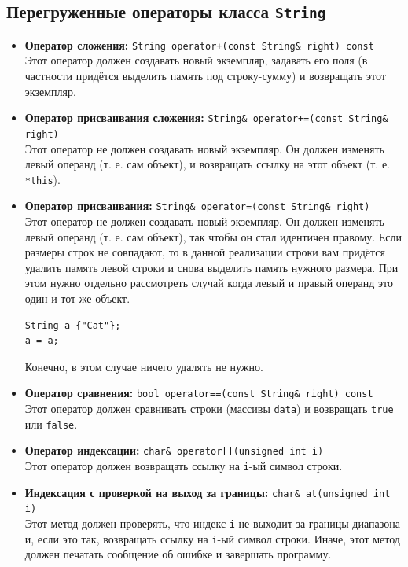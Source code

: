 \documentclass{article}
\begin{document}
\subsection*{Перегруженные операторы класса \texttt{String}}
\begin{itemize}
\item \textbf{Оператор сложения:} \texttt{String operator+(const String\& right) const} \\
Этот оператор должен создавать новый экземпляр, задавать его поля (в частности придётся выделить память под строку-сумму) и возвращать этот экземпляр.

\item \textbf{Оператор присваивания сложения:} \texttt{String\& operator+=(const String\& right)}\\
Этот оператор не должен создавать новый экземпляр. Он должен изменять левый операнд (т. е. сам объект), и возвращать ссылку на этот объект (т. е. \texttt{*this}).

\item \textbf{Оператор присваивания:} \texttt{String\& operator=(const String\& right)}\\
Этот оператор не должен создавать новый экземпляр. Он должен изменять левый операнд (т. е. сам объект), так чтобы он стал идентичен правому. Если размеры строк не совпадают, то в данной реализации строки вам придётся удалить память левой строки и снова выделить память нужного размера. При этом нужно отдельно рассмотреть случай когда левый и правый операнд это один и тот же объект. 
\begin{lstlisting}
String a {"Cat"};
a = a;
\end{lstlisting}
Конечно, в этом случае ничего удалять не нужно.

\item \textbf{Оператор сравнения:} \texttt{bool operator==(const String\& right) const}\\
Этот оператор должен сравнивать строки (массивы \texttt{data}) и возвращать \texttt{true} или \texttt{false}.

\item \textbf{Оператор индексации:} \texttt{char\& operator[](unsigned int i)}\\
Этот оператор должен возвращать ссылку на \texttt{i}-ый символ строки.

\item \textbf{Индексация с проверкой на выход за границы:} \texttt{char\& at(unsigned int i)}\\
Этот метод должен проверять, что индекс \texttt{i} не выходит за границы диапазона и, если это так, возвращать ссылку на \texttt{i}-ый символ строки. Иначе, этот метод должен печатать сообщение об ошибке и завершать программу.
\end{itemize}
\fi
\end{document}
